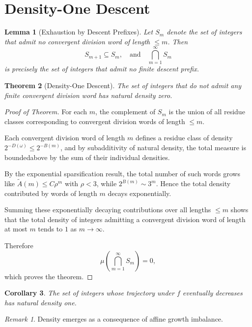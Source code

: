 \documentclass[12pt, oneside]{article}
\numberwithin{equation}{section}
\theoremstyle{definition}
\theoremstyle{plain}
\newtheorem{theorem}{Theorem}[section]
\newtheorem{lemma}[theorem]{Lemma}
\newtheorem{corollary}[theorem]{Corollary}
\theoremstyle{remark}
\newtheorem*{remark}{Remark}
\begin{document}
\section{Density-One Descent}
\label{sec:density-one-descent}

\begin{lemma}[Exhaustion by Descent Prefixes]
Let $S_m$ denote the set of integers that admit no convergent division word
of length $\le m$. Then
\[
S_{m+1} \subseteq S_m,
\quad\text{and}\quad
\bigcap_{m=1}^\infty S_m
\]
is precisely the set of integers that admit no finite descent prefix.
\end{lemma}

\begin{theorem}[Density-One Descent]
The set of integers that do not admit any finite convergent division word
has natural density zero.
\end{theorem}

\begin{proof}[Proof of Theorem]
For each $m$, the complement of $S_m$ is the union of all residue classes
corresponding to convergent division words of length $\le m$.

Each convergent division word of length $m$ defines a residue class of
density $2^{-D(\omega)} \le 2^{-B(m)}$, and by subadditivity of natural density,
the total measure is boundedabove by the sum of their individual densities.

By the exponential sparsification result, the total number of such words
grows like $\widetilde A(m) \le C \rho^m$ with $\rho < 3$, while
$2^{B(m)} \sim 3^m$. Hence the total density contributed by words of length
$m$ decays exponentially.

Summing these exponentially decaying contributions over all lengths $\le m$
shows that the total density of integers admitting a convergent division word
of length at most $m$ tends to $1$ as $m \to \infty$.

Therefore
\[
\mu\!\left(\bigcap_{m=1}^\infty S_m\right) = 0,
\]
which proves the theorem.
\end{proof}

\begin{corollary}
The set of integers whose trajectory under $f$ eventually decreases
has natural density one.
\end{corollary}

\begin{remark}
Density emerges as a consequence of affine growth imbalance.
\end{remark}
\end{document}
